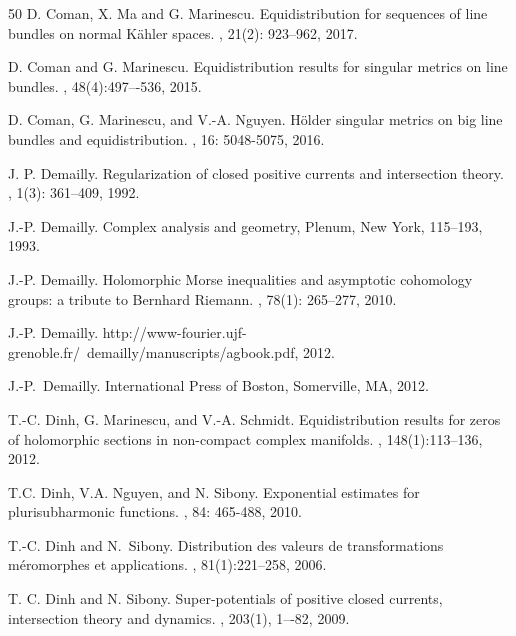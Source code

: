\documentclass[11pt,leqno,oneside]{amsart}
\numberwithin{equation}{section}
\begin{document}
\begin{thebibliography}{50}
D. Coman, X. Ma and G. Marinescu.
\newblock Equidistribution for sequences of line bundles on normal K\"{a}hler spaces.
, 21(2): 923--962, 2017.

D. Coman and G. Marinescu.
\newblock Equidistribution results for singular metrics on line bundles.
, 48(4):497–-536, 2015.

D. Coman, G. Marinescu, and V.-A. Nguyen.
\newblock Hölder singular metrics on big line bundles and equidistribution.
, 16: 5048-5075, 2016.

J. P. Demailly.
\newblock Regularization of closed positive currents and intersection theory.
, 1(3): 361--409, 1992.

J.-P. Demailly.
\newblock Complex analysis and geometry, Plenum, New York, 115--193, 1993.

J.-P. Demailly.
\newblock Holomorphic Morse inequalities and asymptotic cohomology groups: a tribute to Bernhard Riemann.
, 78(1): 265--277, 2010.

J.-P. Demailly.
\newblock http://www-fourier.ujf-grenoble.fr/~demailly/manuscripts/agbook.pdf, 2012.

J.-P.~Demailly.
\newblock International Press of Boston, Somerville, MA, 2012.

T.-C. Dinh, G. Marinescu, and V.-A. Schmidt. 
\newblock Equidistribution results for zeros of holomorphic sections in non-compact complex manifolds. 
, 148(1):113–136, 2012.

T.C. Dinh, V.A. Nguyen, and N. Sibony.
\newblock Exponential estimates for plurisubharmonic functions.
, 84: 465-488, 2010.

T.-C. Dinh and N.~Sibony.
\newblock Distribution des valeurs de transformations m\'eromorphes et applications.
, 81(1):221--258, 2006.

T. C. Dinh and N. Sibony.
\newblock Super-potentials of positive closed currents, intersection theory and dynamics.
, 203(1), 1–-82, 2009.


\end{thebibliography}
\end{document}
